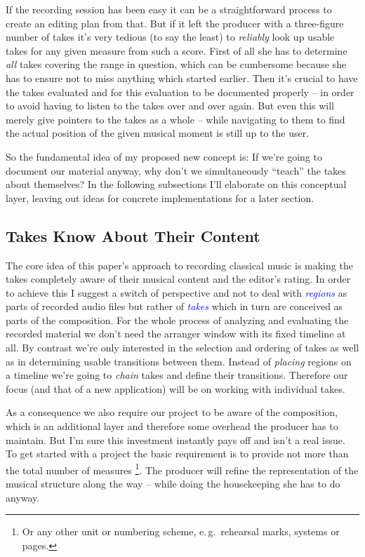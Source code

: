 \documentclass[11pt,a4paper]{article}
\newcommand*{\term}[1]{\textcolor{blue}{\emph{#1}}}
\begin{document}
If the recording session has been easy it can be a straightforward process to
create an editing plan from that.
But if it left the producer with a three-figure number of takes it's very
tedious (to say the least) to \emph{reliably} look up usable takes for any given
measure from such a score.
First of all she has to determine \emph{all} takes covering the range in
question, which can be cumbersome because she has to ensure not to miss anything
which started earlier.
Then it's crucial to have the takes evaluated and for this evaluation to be
documented properly -- in order to avoid having to listen to the takes over and
over again.
But even this will merely give pointers to the takes as a whole -- while
navigating to them to find the actual position of the given musical moment is
still up to the user.

So the fundamental idea of my proposed new concept is:
If we're going to document our material anyway, why don't we simultaneously
“teach” the takes about themselves?
In the following subsections I'll elaborate on this conceptual layer, leaving out
ideas for concrete implementations for a later section.

\subsection{Takes Know About Their Content}

The core idea of this paper's approach to recording classical music is making
the takes completely aware of their musical content and the editor's rating.
In order to achieve this I suggest a switch of perspective and not to deal with
\term{regions} as parts of recorded audio files but rather of \term{takes} which
in turn are conceived as parts of the composition.
For the whole process of analyzing and evaluating the recorded material we don't
need the arranger window with its fixed timeline at all.
By contrast we're only interested in the selection and ordering of takes as well
as in determining usable transitions between them.
Instead of \emph{placing} regions on a timeline we're going to \emph{chain}
takes and define their transitions.
Therefore our focus (and that of a new application) will be on working with
individual takes.

As a consequence we also require our project to be aware of the composition,
which is an additional layer and therefore some overhead the producer has to
maintain.
But I'm sure this investment instantly pays off and isn't a real issue.
To get started with a project the basic requirement is to provide not more than
the total number of measures%
\footnote{Or any other unit or numbering scheme, e.\,g.\ rehearsal marks,
systems or pages.}.
The producer will refine the representation of the musical structure along the
way -- while doing the housekeeping she has to do anyway.
\end{document}
